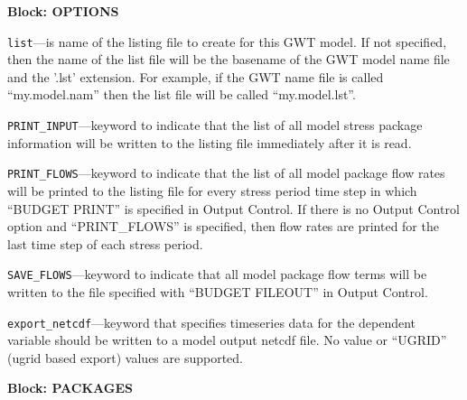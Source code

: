 
\item \textbf{Block: OPTIONS}

\begin{description}
\item \texttt{list}---is name of the listing file to create for this GWT model.  If not specified, then the name of the list file will be the basename of the GWT model name file and the '.lst' extension.  For example, if the GWT name file is called ``my.model.nam'' then the list file will be called ``my.model.lst''.

\item \texttt{PRINT\_INPUT}---keyword to indicate that the list of all model stress package information will be written to the listing file immediately after it is read.

\item \texttt{PRINT\_FLOWS}---keyword to indicate that the list of all model package flow rates will be printed to the listing file for every stress period time step in which ``BUDGET PRINT'' is specified in Output Control.  If there is no Output Control option and ``PRINT\_FLOWS'' is specified, then flow rates are printed for the last time step of each stress period.

\item \texttt{SAVE\_FLOWS}---keyword to indicate that all model package flow terms will be written to the file specified with ``BUDGET FILEOUT'' in Output Control.

\item \texttt{export\_netcdf}---keyword that specifies timeseries data for the dependent variable should be written to a model output netcdf file.  No value or ``UGRID'' (ugrid based export) values are supported.

\end{description}
\item \textbf{Block: PACKAGES}

